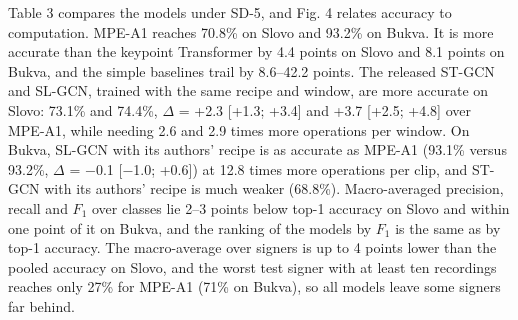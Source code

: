 \documentclass[a4paper,fleqn]{cas-dc}
\begin{document}
Table 3 compares the models under SD-5, and Fig. 4 relates accuracy to computation. MPE-A1 reaches 70.8\% on Slovo and 93.2\% on Bukva. It is more accurate than the keypoint Transformer by 4.4 points on Slovo and 8.1 points on Bukva, and the simple baselines trail by 8.6--42.2 points. The released ST-GCN and SL-GCN, trained with the same recipe and window, are more accurate on Slovo: 73.1\% and 74.4\%, \(\Delta\) = +2.3 {[}+1.3; +3.4{]} and +3.7 {[}+2.5; +4.8{]} over MPE-A1, while needing 2.6 and 2.9 times more operations per window. On Bukva, SL-GCN with its authors' recipe is as accurate as MPE-A1 (93.1\% versus 93.2\%, \(\Delta\) = $-$0.1 {[}$-$1.0; +0.6{]}) at 12.8 times more operations per clip, and ST-GCN with its authors' recipe is much weaker (68.8\%). Macro-averaged precision, recall and \(F_1\) over classes lie 2--3 points below top-1 accuracy on Slovo and within one point of it on Bukva, and the ranking of the models by \(F_1\) is the same as by top-1 accuracy. The macro-average over signers is up to 4 points lower than the pooled accuracy on Slovo, and the worst test signer with at least ten recordings reaches only 27\% for MPE-A1 (71\% on Bukva), so all models leave some signers far behind.
\end{document}
